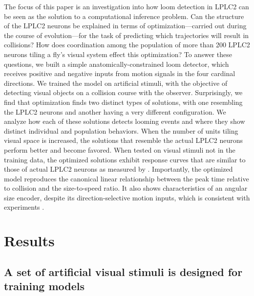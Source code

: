 \documentclass[pdftex,9pt,lineno]{elife}
\begin{document}
The focus of this paper is an investigation into how loom detection in LPLC2 can be seen as the solution to a computational inference problem. Can the structure of the LPLC2 neurons be explained in terms of optimization---carried out during the course of evolution---for the task of predicting which trajectories will result in collisions?
How does coordination among the population of more than 200 LPLC2 neurons tiling a fly's visual system effect this optimization?  To answer these questions, we built a simple anatomically-constrained loom detector, which receives positive and negative inputs from motion signals in the four cardinal directions. We trained the model on artificial stimuli, with the objective of detecting visual objects on a collision course with the observer. Surprisingly, we find that optimization finds two distinct types of solutions, with one resembling the LPLC2 neurons and another having a very different configuration. We analyze how each of these solutions detects looming events and where they show distinct individual and population behaviors.
When the number of units tiling visual space is increased, the solutions that resemble the actual LPLC2 neurons perform better and become favored. When tested on visual stimuli not in the training data, the optimized solutions exhibit response curves that are similar to those of actual LPLC2 neurons as measured by \cite{klapoetke2017ultra}. Importantly, the optimized model reproduces the canonical linear relationship between the peak time relative to collision and the size-to-speed ratio. It also shows characteristics of an angular size encoder, despite its direction-selective motion inputs, which is consistent with experiments \citep{gabbiani1999computation,von2017feature,ache2019neural}.

\section{Results}

\subsection{A set of artificial visual stimuli is designed for training models}
\end{document}
